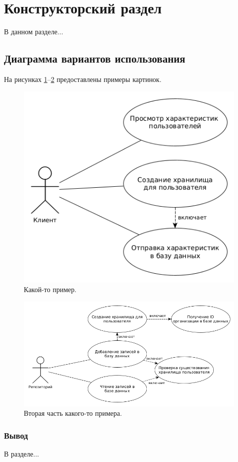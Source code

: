 \section{Конструкторский раздел}
В данном разделе...

\subsection{Диаграмма вариантов использования}
На рисунках \ref{fig:useCase}--\ref{fig:useCaseRepo} предоставлены примеры картинок.

\begin{figure}[H]
	\centering
	\includegraphics[scale=0.5]{img/useCase.png}
	\caption{Какой-то пример. }
	\label{fig:useCase}
\end{figure}

\begin{figure}[H]
	\centering
	\includegraphics[scale=0.5]{img/useCaseServer.png}
	\caption{Вторая часть какого-то примера. }
	\label{fig:useCaseRepo}
\end{figure}

\subsubsection*{Вывод}
В разделе...

\pagebreak